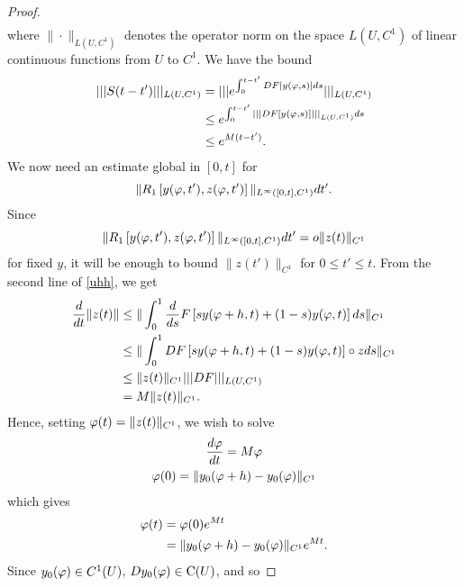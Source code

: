 \begin{proof}
\begin{equation}
\begin{split}
\end{split}
\end{equation}
%
%
where $\| \cdot \|_{L(U, C^{1})}$ denotes the operator norm on the space
$L(U,C^{1})$ of linear continuous functions from $U$ to $C^{1}$. We have the bound
%
%
\begin{equation}
  \label{op-norm}
\begin{split}
  | | | S(t-t') | | |_{L(U, C^{1})} 
  & = | | | e^{\int_{0}^{t-t'} DF \left[ y(\varphi,s)
  \right] ds} | | |_{L(U, C^{1})}
  \\\
  & \le e^{\int_{0}^{t-t'} | | | DF\left[ y(\varphi,s) \right]| | |_{L(U, C^{1})}ds} 
  \\
  & \le e^{M(t-t')}.
\end{split}
\end{equation}
%
%
We now need an estimate global in $[0,t]$ for
$$ \| R_{1}\left[ y(\varphi,t'), z(\varphi,t')
\right] \|_{L^{\infty}\left( [0,t], C^{1} \right)} dt'.$$ Since 
$$ \| R_{1}\left[ y(\varphi,t'), z(\varphi,t')
\right] \|_{L^{\infty}\left( [0,t], C^{1} \right)} dt' = o\| z(t)
\|_{C^{1}}$$ for fixed
$y$, it will be enough to bound $\| z(t') \|_{C^{1}}$ for $0 \le t' \le t$. From the
second line of \eqref{uhh}, we get
%
%
\begin{equation*}
\begin{split}
\frac{d}{dt} \| z(t) \|
& \le \| \int_{0}^{1} \frac{d}{ds} F\left[ sy(\varphi+h, t) + (1-s)y(\varphi,t) \right]ds
\|_{C^{1}}
\\
& \le \| \int_{0}^{1} DF\left[  sy(\varphi+h, t) + (1-s)y(\varphi,t) \right] \circ z ds
\|_{C^{1}}
\\
& \le \| z(t) \|_{C^{1}} | | | DF | | |_{L(U, C^{1})}
\\
& = M \| z(t) \|_{C^{1}}.
\end{split}
\end{equation*}
%
%
Hence, setting $\varphi(t) =  \| z(t) \|_{C^{1}}$, we wish to solve
%
%
\begin{gather*}
\frac{d \varphi}{dt} = M \varphi
\\
\varphi(0) = \| y_{0}(\varphi+h) - y_{0}(\varphi) \|_{C^{1}}
\end{gather*}
%
%
which gives
%
%
\begin{equation*}
\begin{split}
  \varphi(t) & = \varphi(0)e^{Mt}
  \\
  & = \| y_{0}(\varphi+h) - y_{0}(\varphi) \|_{C^{1}} e^{Mt}.
\end{split}
\end{equation*}
%
%
Since $y_{0}(\varphi) \in C^{1}(U)$, $Dy_{0}(\varphi) \in \text{C}(U)$, and so

\end{proof}
